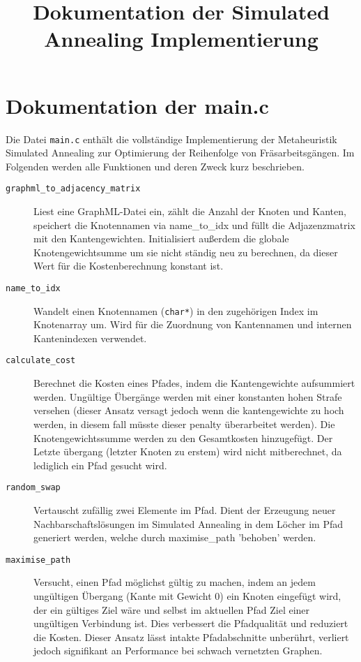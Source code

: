 \documentclass{article}
\begin{document}
\title{Dokumentation der Simulated Annealing Implementierung}
\maketitle

\section*{Dokumentation der main.c}

Die Datei \texttt{main.c} enthält die vollständige Implementierung der Metaheuristik Simulated Annealing zur Optimierung der Reihenfolge von Fräsarbeitsgängen. Im Folgenden werden alle Funktionen und deren Zweck kurz beschrieben.

\begin{description}
    \item[\texttt{graphml\_to\_adjacency\_matrix}] Liest eine GraphML-Datei ein, zählt die Anzahl der Knoten und Kanten, speichert die Knotennamen via name\_to\_idx und füllt die Adjazenzmatrix mit den Kantengewichten. Initialisiert außerdem die globale Knotengewichtsumme um sie nicht ständig neu zu berechnen, da dieser Wert für die Kostenberechnung konstant ist.
    \item[\texttt{name\_to\_idx}] Wandelt einen Knotennamen (\texttt{char*}) in den zugehörigen Index im Knotenarray um. Wird für die Zuordnung von Kantennamen und internen Kantenindexen verwendet.
    \item[\texttt{calculate\_cost}] Berechnet die Kosten eines Pfades, indem die Kantengewichte aufsummiert werden. Ungültige Übergänge werden mit einer konstanten hohen Strafe versehen (dieser Ansatz versagt jedoch wenn die kantengewichte zu hoch werden, in diesem fall müsste dieser penalty überarbeitet werden). Die Knotengewichtssumme werden zu den Gesamtkosten hinzugefügt. Der Letzte übergang (letzter Knoten zu erstem) wird nicht mitberechnet, da lediglich ein Pfad gesucht wird.
    \item[\texttt{random\_swap}] Vertauscht zufällig zwei Elemente im Pfad. Dient der Erzeugung neuer Nachbarschaftslösungen im Simulated Annealing in dem Löcher im Pfad generiert werden, welche durch maximise\_path 'behoben' werden.
    \item[\texttt{maximise\_path}] Versucht, einen Pfad möglichst gültig zu machen, indem an jedem ungültigen Übergang (Kante mit Gewicht 0) ein Knoten eingefügt wird, der ein gültiges Ziel wäre und selbst im aktuellen Pfad Ziel einer ungültigen Verbindung ist. Dies verbessert die Pfadqualität und reduziert die Kosten. Dieser Ansatz lässt intakte Pfadabschnitte unberührt, verliert jedoch signifikant an Performance bei schwach vernetzten Graphen.

\end{description}
\end{document}
